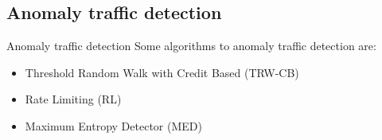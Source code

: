 \subsection*{Anomaly traffic detection}
\begin{frame}{Anomaly traffic detection}
Some algorithms to anomaly traffic detection are:
\begin{itemize}
\item<2-> Threshold Random Walk with Credit Based (TRW-CB)
\item<3-> Rate Limiting (RL)
\item<4-> Maximum Entropy Detector (MED)
\end{itemize}
\end{frame}